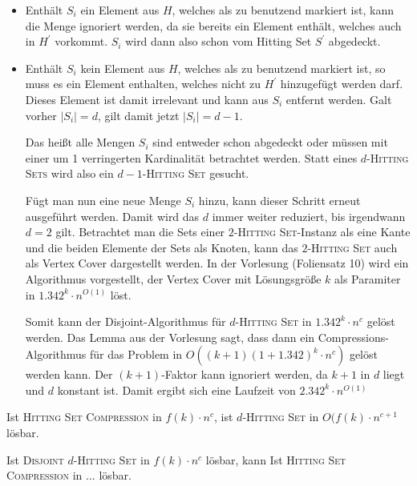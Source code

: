 \begin{itemize}
\item Enthält $S_i$ ein Element aus $H$, welches als zu benutzend markiert ist, kann die Menge ignoriert werden, da sie bereits ein Element enthält, welches auch in $H^\prime$ vorkommt. $S_i$ wird dann also schon vom Hitting Set $S^\prime$ abgedeckt.

\item Enthält $S_i$ kein Element aus $H$, welches als zu benutzend markiert ist, so muss es ein Element enthalten, welches nicht zu $H^\prime$ hinzugefügt werden darf. Dieses Element ist damit irrelevant und kann aus $S_i$ entfernt werden. Galt vorher $|S_i| = d$, gilt damit jetzt $|S_i|=d-1$.

Das heißt alle Mengen $S_i$ sind entweder schon abgedeckt oder müssen mit einer um 1 verringerten Kardinalität betrachtet werden. Statt eines $d$-\textsc{Hitting Sets} wird also ein $d-1$-\textsc{Hitting Set} gesucht. 

Fügt man nun eine neue Menge $S_i$ hinzu, kann dieser Schritt erneut ausgeführt werden. Damit wird das $d$ immer weiter reduziert, bis irgendwann $d=2$ gilt. Betrachtet man die Sets einer $2$-\textsc{Hitting Set}-Instanz als eine Kante und die beiden Elemente der Sets als Knoten, kann das $2$-\textsc{Hitting Set} auch als Vertex Cover dargestellt werden. In der Vorlesung (Foliensatz 10) wird ein Algorithmus vorgestellt, der Vertex Cover mit Lösungsgröße $k$ als Paramiter in $1.342^k \cdot n^{O(1)}$ löst. 

Somit kann der Disjoint-Algorithmus für $d$-\textsc{Hitting Set} in $1.342^k \cdot n^c$ gelöst werden. Das Lemma aus der Vorlesung sagt, dass dann ein Compressions-Algorithmus für das Problem in $O((k+1)(1+1.342)^k \cdot n^c)$ gelöst werden kann. Der $(k+1)$-Faktor kann ignoriert werden, da $k+1$ in $d$ liegt und $d$ konstant ist. Damit ergibt sich eine Laufzeit von $2.342^k \cdot n^{O(1)}$ 


\end{itemize}



Ist \textsc{Hitting Set Compression} in $f(k)\cdot n^c$, ist $d$-\textsc{Hitting Set} in $O(f(k) \cdot n^{c+1}$ lösbar. 

Ist \textsc{Disjoint} $d$-\textsc{Hitting Set} in $f(k) \cdot n^c$ lösbar, kann Ist \textsc{Hitting Set Compression} in ... lösbar.

\subexercise
\subexercise



